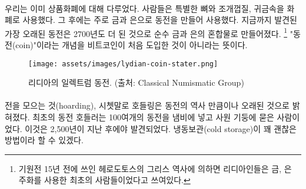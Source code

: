 \paragraph{}
\begin{comment}
	We already touched on commodity money above. People used special bones,
	seashells, and precious metals as money. Later on, mainly coins made out of
	precious metals like gold and silver were used as money. The oldest coin found
	so far is made of a natural gold-and-silver mix and was made more than 2700
	years ago.\footnote{According to the Greek historian Herodotus, writing in the
		fifth century BC, the Lydians were the first people to have used gold and silver
		coinage. \cite{coinage-origins}} If something is new in Bitcoin, the concept of
	a coin is not it.
\end{comment}
우리는 이미 상품화폐에 대해 다루었다. 
사람들은 특별한 뼈와 조개껍질, 귀금속을 화폐로 사용했다. 
그 후에는 주로 금과 은으로 동전을 만들어 사용했다.
지금까지 발견된 가장 오래된 동전은 2700년도 더 된 것으로 순수 금과 은의 혼합물로 만들어졌다. \footnote{기원전 15년 전에 쓰인 헤로도토스의 그리스 역사에 의하면 리디아인들은 금, 은 주화를 사용한 최초의 사람들이었다고 쓰여있다.\cite{coinage-origins}}
"동전(coin)"이라는 개념을 비트코인이 처음 도입한 것이 아니라는 뜻이다.

\newpage

\begin{figure}
	\centering
	\texttt{[image: assets/images/lydian-coin-stater.png]}
	\caption{리디아의 일렉트럼 동전. (출처: Classical Numismatic Group)}
	\label{fig:lydian-coin-stater}
\end{figure}

\paragraph{}
\begin{comment}
	Turns out that hoarding coins, or hodling, to use today's parlance, is
	almost as old as coins. The earliest coin hodler was someone who put
	almost a hundred of these coins in a pot and buried it in the
	foundations of a temple, only to be found 2500 years later. Pretty good
	cold storage if you ask me.
\end{comment}
전을 모으는 것(hoarding), 시쳇말로 호들링은 동전의 역사 만큼이나 오래된 것으로 밝혀졌다. 
최초의 동전 호들러는 100여개의 동전을 냄비에 넣고 사원 기둥에 묻은 사람이었다. 
이것은 2,500년이 지난 후에야 발견되었다. 냉동보관(cold storage)이 꽤 괜찮은 방법이라 할 수 있겠다.

